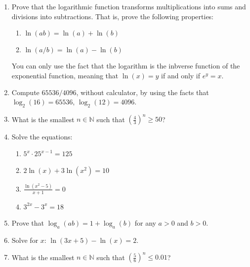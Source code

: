 \documentclass{article}
\begin{document}
\begin{enumerate}[leftmargin = 0.5cm, label = \arabic*., rightmargin = 0.2cm]

    \item Prove that the logarithmic function transforms multiplications into sums and divisions into subtractions. That is, prove the following properties: 
    \begin{enumerate}[leftmargin = 0.5cm, label = \alph*., rightmargin = 0.2cm]
        \item $\ln(ab) = \ln(a) + \ln(b)$
        \item $\ln(a/b) = \ln(a) - \ln(b)$
    \end{enumerate}
    You can only use the fact that the logarithm is the inbverse function of the exponential function, meaning that $\ln(x) = y$ if and only if $e^y = x$.

    \item Compute $65536 / 4096$, without calculator, by using the facts that $\log_2(16) = 65536$, $\log_2(12) = 4096$.
    
    \item What is the smallest $n \in \mathbb{N}$ such that $\left( \frac{4}{3} \right)^n \geq 50$?

    \item Solve the equations:
    
    \begin{enumerate}[leftmargin = 0.5cm, label = (\alph*), rightmargin = 0.2cm]
    
        \item $5^x \cdot 25^{x-1} = 125$

        \item $2 \ln(x) + 3 \ln(x^2) = 10$

        \item $\frac{\ln(x^2 - 5)}{x + 1} = 0$

        \item $3^{2x} - 3^{x} = 18$
    
    \end{enumerate}

    \item Prove that $\log_a(ab) = 1 + \log_a(b)$ for any $a > 0$ and $b > 0$.

    \item Solve for $x$: $\ln(3x + 5) - \ln(x) = 2$.

    \item What is the smallest $n \in \mathbb{N}$ such that $\left( \frac{5}{6} \right)^n \leq 0.01$?


\end{enumerate}
\end{document}
